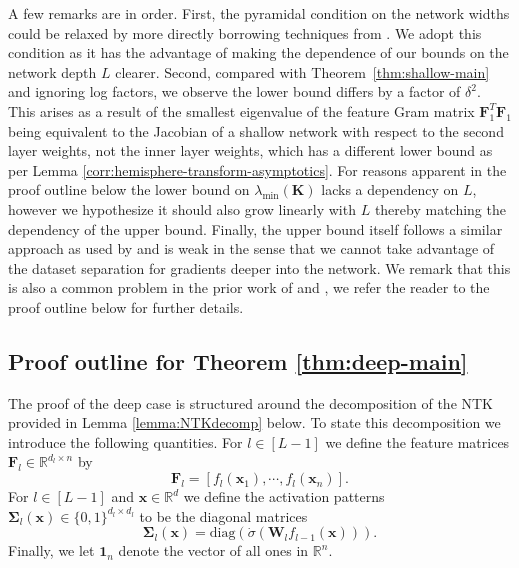 \documentclass{article}
\theoremstyle{definition}
\newcommand*{\R}{\mathbb{R}}
\def\vx{{\bm{x}}}
\def\mF{{\bm{F}}}
\def\mK{{\bm{K}}}
\def\mW{{\bm{W}}}
\def\mSigma{{\bm{\Sigma}}}
\begin{document}
A few remarks are in order. First, the pyramidal condition on the network widths could be relaxed by more directly borrowing techniques from \cite{nguyen2021tight}. We adopt this condition as it has the advantage of making the dependence of our bounds on the network depth $L$ clearer. Second, compared with Theorem~\ref{thm:shallow-main} and ignoring log factors, we observe the lower bound differs by a factor of $\delta^2$. This arises as a result of the smallest eigenvalue of the feature Gram matrix $\mF_1^T \mF_1$ being equivalent to the Jacobian of a shallow network with respect to the second layer weights, not the inner layer weights, which has a different lower bound as per Lemma \ref{corr:hemisphere-transform-asymptotics}. 
For reasons apparent in the proof outline below the lower bound on $\lambda_{\min}(\mK)$ lacks a dependency on $L$, however we hypothesize it should also grow linearly with $L$ thereby matching the dependency of the upper bound. 
Finally, the upper bound itself follows a similar approach as used by \cite{nguyen2021tight} and is weak in the sense that we cannot take advantage of the dataset separation for gradients deeper into the network. We remark that this is also a common problem in the prior work of \cite{nguyen2021tight} and \cite{bombari2022memorization}, we refer the reader to the proof outline below for further details. 







\subsection{Proof outline for Theorem \ref{thm:deep-main}}\label{subsec:deep-proof-sketch}

The proof of the deep case is structured around the decomposition of the NTK provided in Lemma \ref{lemma:NTKdecomp} below. To state this decomposition we introduce the following quantities. For $l \in [L - 1]$ we define the feature matrices $\mF_l \in \R^{d_l \times n}$ by
\[\mF_l = [f_l(\vx_1), \cdots, f_l(\vx_n)]. \]
For $l \in [L - 1]$ and $\vx \in \R^d$ we define the activation patterns $\mSigma_l(\vx) \in \{0, 1\}^{d_l \times d_l}$ to be the diagonal matrices
\[\mSigma_l(\vx) = \text{diag}(\dot{\sigma}(\mW_{l}f_{l - 1}(\vx))). \]
Finally, we let $\textbf{1}_{n}$ denote the vector of all ones in $\R^n$.
\end{document}
